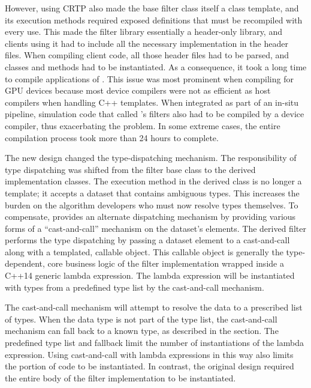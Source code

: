 However, using CRTP also made the base filter class itself a class template, and its execution methods required exposed definitions that must be recompiled with every use.
This made the \vtkm filter library essentially a header-only library, and clients using it had to include all the necessary implementation in the header files.
When compiling client code, all those header files had to be parsed, and classes and methods had to be instantiated.
As a consequence, it took a long time to compile applications of \vtkm.
This issue was most prominent when compiling for GPU devices because most device compilers were not as efficient as host compilers when handling C++ templates.
When integrated as part of an in-situ pipeline, simulation code that called \vtkm's filters also had to be compiled by a device compiler, thus exacerbating the problem.
In some extreme cases, the entire compilation process took more than 24 hours to complete.

The new design changed the type-dispatching mechanism.
The responsibility of type dispatching was shifted from the filter base class to the derived implementation classes.
The execution method in the derived class is no longer a template; it accepts a dataset that contains ambiguous types.
This increases the burden on the algorithm developers who must now resolve types themselves.
To compensate, \vtkm provides an alternate dispatching mechanism by providing various forms of a ``cast-and-call'' mechanism on the dataset's elements.
The derived filter performs the type dispatching by passing a dataset element to a cast-and-call along with a templated, callable object.
This callable object is generally the type-dependent, core business logic of the filter implementation wrapped inside a C++14 generic lambda expression.
The lambda expression will be instantiated with types from a predefined type list by the cast-and-call mechanism.

The cast-and-call mechanism will attempt to resolve the data to a prescribed list of types.
When the data type is not part of the type list, the cast-and-call mechanism can fall back to a known type, as described in the  section.
The predefined type list and fallback limit the number of instantiations of the lambda expression.
Using cast-and-call with lambda expressions in this way also limits the portion of code to be instantiated.
In contrast, the original design required the entire body of the filter implementation to be instantiated.

